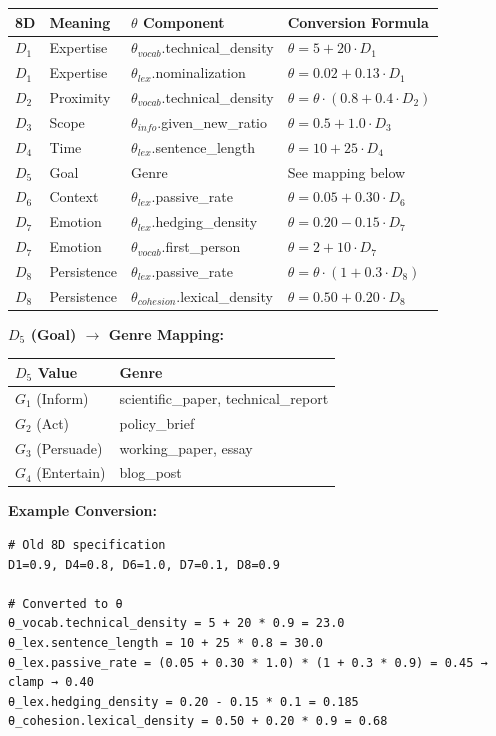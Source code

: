 \begin{center}
\begin{tabular}{llll}
\toprule
8D & Meaning & $\theta$ Component & Conversion Formula \\
\midrule
$D_1$ & Expertise & $\theta_{vocab}$.technical\_density & $\theta = 5 + 20 \cdot D_1$ \\
$D_1$ & Expertise & $\theta_{lex}$.nominalization & $\theta = 0.02 + 0.13 \cdot D_1$ \\
$D_2$ & Proximity & $\theta_{vocab}$.technical\_density & $\theta = \theta \cdot (0.8 + 0.4 \cdot D_2)$ \\
$D_3$ & Scope & $\theta_{info}$.given\_new\_ratio & $\theta = 0.5 + 1.0 \cdot D_3$ \\
$D_4$ & Time & $\theta_{lex}$.sentence\_length & $\theta = 10 + 25 \cdot D_4$ \\
$D_5$ & Goal & Genre & See mapping below \\
$D_6$ & Context & $\theta_{lex}$.passive\_rate & $\theta = 0.05 + 0.30 \cdot D_6$ \\
$D_7$ & Emotion & $\theta_{lex}$.hedging\_density & $\theta = 0.20 - 0.15 \cdot D_7$ \\
$D_7$ & Emotion & $\theta_{vocab}$.first\_person & $\theta = 2 + 10 \cdot D_7$ \\
$D_8$ & Persistence & $\theta_{lex}$.passive\_rate & $\theta = \theta \cdot (1 + 0.3 \cdot D_8)$ \\
$D_8$ & Persistence & $\theta_{cohesion}$.lexical\_density & $\theta = 0.50 + 0.20 \cdot D_8$ \\
\bottomrule
\end{tabular}
\end{center}

\textbf{$D_5$ (Goal) $\rightarrow$ Genre Mapping:}
\begin{center}
\begin{tabular}{ll}
\toprule
$D_5$ Value & Genre \\
\midrule
$G_1$ (Inform) & scientific\_paper, technical\_report \\
$G_2$ (Act) & policy\_brief \\
$G_3$ (Persuade) & working\_paper, essay \\
$G_4$ (Entertain) & blog\_post \\
\bottomrule
\end{tabular}
\end{center}

\textbf{Example Conversion:}
\begin{verbatim}
# Old 8D specification
D1=0.9, D4=0.8, D6=1.0, D7=0.1, D8=0.9

# Converted to θ
θ_vocab.technical_density = 5 + 20 * 0.9 = 23.0
θ_lex.sentence_length = 10 + 25 * 0.8 = 30.0
θ_lex.passive_rate = (0.05 + 0.30 * 1.0) * (1 + 0.3 * 0.9) = 0.45 → clamp → 0.40
θ_lex.hedging_density = 0.20 - 0.15 * 0.1 = 0.185
θ_cohesion.lexical_density = 0.50 + 0.20 * 0.9 = 0.68
\end{verbatim}

